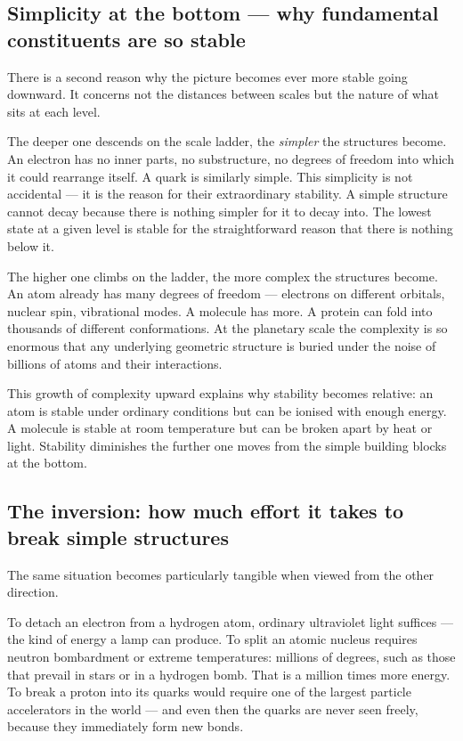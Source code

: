 \subsection*{Simplicity at the bottom --- why fundamental constituents are so stable}

There is a second reason why the picture becomes ever more stable
going downward. It concerns not the distances between scales but the
nature of what sits at each level.

The deeper one descends on the scale ladder, the \emph{simpler} the
structures become. An electron has no inner parts, no substructure,
no degrees of freedom into which it could rearrange itself. A quark
is similarly simple. This simplicity is not accidental --- it is the
reason for their extraordinary stability. A simple structure cannot
decay because there is nothing simpler for it to decay into. The
lowest state at a given level is stable for the straightforward
reason that there is nothing below it.

The higher one climbs on the ladder, the more complex the structures
become. An atom already has many degrees of freedom --- electrons on
different orbitals, nuclear spin, vibrational modes. A molecule has
more. A protein can fold into thousands of different conformations.
At the planetary scale the complexity is so enormous that any
underlying geometric structure is buried under the noise of billions
of atoms and their interactions.

This growth of complexity upward explains why stability becomes
relative: an atom is stable under ordinary conditions but can be
ionised with enough energy. A molecule is stable at room temperature
but can be broken apart by heat or light. Stability diminishes the
further one moves from the simple building blocks at the bottom.

\subsection*{The inversion: how much effort it takes to break simple structures}

The same situation becomes particularly tangible when viewed from the
other direction.

To detach an electron from a hydrogen atom, ordinary ultraviolet light
suffices --- the kind of energy a lamp can produce. To split an atomic
nucleus requires neutron bombardment or extreme temperatures: millions
of degrees, such as those that prevail in stars or in a hydrogen bomb.
That is a million times more energy. To break a proton into its quarks
would require one of the largest particle accelerators in the world ---
and even then the quarks are never seen freely, because they
immediately form new bonds.

